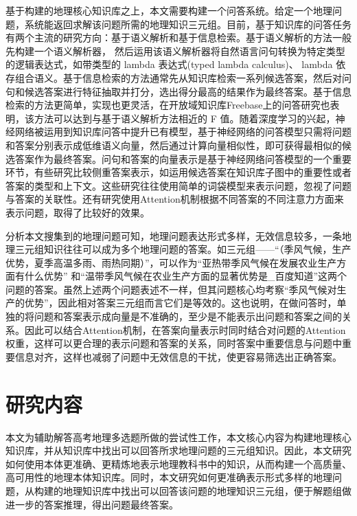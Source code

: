 基于构建的地理核心知识库之上，本文需要构建一个问答系统。给定一个地理问题，系统能返回求解该问题所需的地理知识三元组。目前，基于知识库的问答任务有两个主流的研究方向：基于语义解析\cite{Zettlemoyer0,Cai,BerantCA,Dyer}和基于信息检索\cite{Yao,Bordes1,Dong,Bordes2}。基于语义解析的方法一般先构建一个语义解析器， 然后运用该语义解析器将自然语言问句转换为特定类型的逻辑表达式，如带类型的 lambda 表达式(typed lambda calculus)、 lambda 依存组合语义\cite{Wong,BerantCA,Yih}。基于信息检索的方法通常先从知识库检索一系列候选答案，然后对问句和候选答案进行特征抽取并打分，选出得分最高的结果作为最终答案\cite{Bordes1,Kim}。基于信息检索的方法更简单，实现也更灵活，在开放域知识库Freebase上的问答研究也表明，该方法可以达到与基于语义解析方法相近的 F 值\cite{Dong,Bordes2}。随着深度学习的兴起，神经网络被运用到知识库问答中提升已有模型，基于神经网络的问答模型只需将问题和答案分别表示成低维语义向量，然后通过计算向量相似性，即可获得最相似的候选答案作为最终答案。问句和答案的向量表示是基于神经网络问答模型的一个重要环节，有些研究比较侧重答案表示，如运用候选答案在知识库子图中的重要性\cite{Bordes1}或者答案的类型和上下文\cite{Dong}。这些研究往往使用简单的词袋模型来表示问题，忽视了问题与答案的关联性\cite{Bordes1}。还有研究使用Attention机制根据不同答案的不同注意力方面来表示问题\cite{Zhang}，取得了比较好的效果。

分析本文搜集到的地理问题可知，地理问题表达形式多样，无效信息较多，一条地理三元组知识往往可以成为多个地理问题的答案。如三元组——“（季风气候，生产优势，夏季高温多雨、雨热同期）”，可以作为“亚热带季风气候在发展农业生产方面有什么优势” 和“温带季风气候在农业生产方面的显著优势是\_百度知道”这两个问题的答案。虽然上述两个问题表述不一样，但其问题核心均考察“季风气候对生产的优势”，因此相对答案三元组而言它们是等效的。这也说明，在做问答时，单独的将问题和答案表示成向量是不准确的，至少是不能表示出问题和答案之间的关系。因此可以结合Attention机制，在答案向量表示时同时结合对问题的Attention权重，这样可以更合理的表示问题和答案的关系，同时答案中重要信息与问题中重要信息对齐，这样也减弱了问题中无效信息的干扰，使更容易筛选出正确答案。

\section{研究内容}
本文为辅助解答高考地理多选题所做的尝试性工作，本文核心内容为构建地理核心知识库，并从知识库中找出可以回答所求地理问题的三元组知识。因此，本文研究如何使用本体更准确、更精炼地表示地理教科书中的知识，从而构建一个高质量、高可用性的地理本体知识库。同时，本文研究如何更准确表示形式多样的地理问题，从构建的地理知识库中找出可以回答该问题的地理知识三元组，便于解题组做进一步的答案推理，得出问题最终答案。

